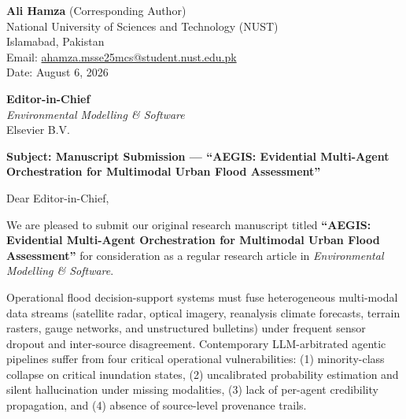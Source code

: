 \documentclass[11pt,a4paper]{article}
\begin{document}
\thispagestyle{empty}

\begin{flushleft}
\textbf{Ali Hamza} (Corresponding Author) \\
National University of Sciences and Technology (NUST) \\
Islamabad, Pakistan \\
Email: \href{mailto:ahamza.msse25mcs@student.nust.edu.pk}{ahamza.msse25mcs@student.nust.edu.pk} \\
Date: August 6, 2026
\end{flushleft}

\vspace{1.2em}

\begin{flushleft}
\textbf{Editor-in-Chief} \\
\textit{Environmental Modelling \& Software} \\
Elsevier B.V.
\end{flushleft}

\vspace{1.2em}

\noindent \textbf{Subject: Manuscript Submission — ``AEGIS: Evidential Multi-Agent Orchestration for Multimodal Urban Flood Assessment''}

\vspace{0.8em}

\noindent Dear Editor-in-Chief,

\vspace{0.6em}

\noindent We are pleased to submit our original research manuscript titled \textbf{``AEGIS: Evidential Multi-Agent Orchestration for Multimodal Urban Flood Assessment''} for consideration as a regular research article in \textit{Environmental Modelling \& Software}.

\vspace{0.6em}

\noindent Operational flood decision-support systems must fuse heterogeneous multi-modal data streams (satellite radar, optical imagery, reanalysis climate forecasts, terrain rasters, gauge networks, and unstructured bulletins) under frequent sensor dropout and inter-source disagreement. Contemporary LLM-arbitrated agentic pipelines suffer from four critical operational vulnerabilities: (1) minority-class collapse on critical inundation states, (2) uncalibrated probability estimation and silent hallucination under missing modalities, (3) lack of per-agent credibility propagation, and (4) absence of source-level provenance trails.
\end{document}

